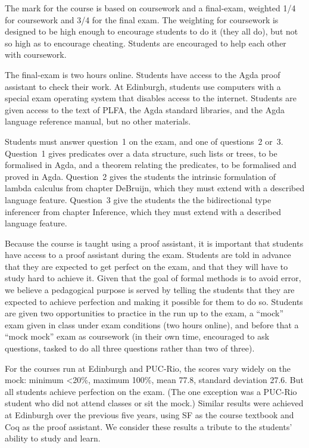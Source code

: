 \documentclass[preprint,authoryear]{elsarticle}
\begin{document}
The mark for the course is based on coursework and a final-exam,
weighted 1/4 for coursework and 3/4 for the final exam.  The weighting
for coursework is designed to be high enough to encourage students to
do it (they all do), but not so high as to encourage cheating.
Students are encouraged to help each other with coursework.

The final-exam is two hours online. Students have access to the Agda
proof assistant to check their work.  At Edinburgh, students use
computers with a special exam operating system that disables access
to the internet.  Students are given access to the text of PLFA,
the Agda standard libraries, and the Agda language reference manual,
but no other materials.

Students must answer question~1 on the exam, and one of questions~2
or~3.  Question~1 gives predicates over a data structure, such lists or
trees, to be formalised in Agda, and a theorem relating the
predicates, to be formalised and proved in Agda.  Question~2 gives the
students the intrinsic formulation of lambda calculus from chapter
DeBruijn, which they must extend with a described language feature.
Question~3 give the students the the bidirectional type inferencer
from chapter Inference, which they must extend with a described
language feature.

Because the course is taught using a proof assistant, it is important
that students have access to a proof assistant during the exam.
Students are told in advance that they are expected to get perfect on
the exam, and that they will have to study hard to achieve it.
Given that the goal of formal methods is to avoid error, we believe a
pedagogical purpose is served by telling the students that they are
expected to achieve perfection and making it possible for them to do
so.  Students are given two opportunities to practice in the run up to
the exam, a ``mock'' exam given in class under exam conditions (two
hours online), and before that a ``mock mock'' exam as coursework (in
their own time, encouraged to ask questions, tasked to do all three
questions rather than two of three).


For the courses run at Edinburgh and PUC-Rio, the scores vary
widely on the mock: minimum <20\%, maximum 100\%, mean
77.8, standard deviation 27.6. But all students achieve perfection on the
exam.  (The one exception was a PUC-Rio student who did not attend
classes or sit the mock.)  Similar results were achieved at Edinburgh
over the previous five years, using SF as the course textbook and Coq
as the proof assistant.  We consider these results a tribute to the
students' ability to study and learn.
\end{document}
